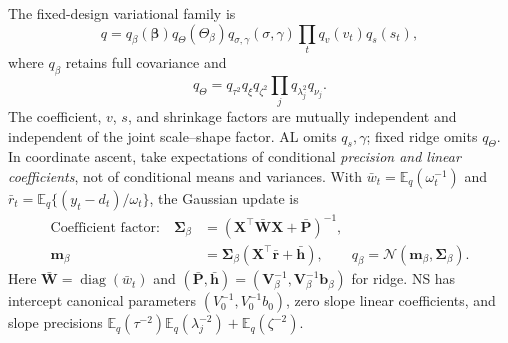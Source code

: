 \documentclass[12pt,letterpaper]{article}
\newcommand{\E}{\mathbb{E}}
\newcommand{\diag}{\operatorname{diag}}
\newcommand{\vect}[1]{\bm{#1}}
\newcommand{\mat}[1]{\bm{#1}}
\newcommand{\Normal}{\mathcal{N}}
\numberwithin{suppalgorithm}{section}
\numberwithin{equation}{section}
\numberwithin{table}{section}
\numberwithin{figure}{section}
\begin{document}
The fixed-design variational family is
\begin{equation}
q=q_\beta(\vect\beta)q_\Theta(\Theta_\beta)
 q_{\sigma,\gamma}(\sigma,\gamma)\prod_t q_v(v_t)q_s(s_t),
\label{eq:supp_generic_vb_family}
\end{equation}
where \(q_\beta\) retains full covariance and
\begin{equation}
q_\Theta=q_{\tau^2}q_\xi q_{\zeta^2}
 \prod_j q_{\lambda_j^2}q_{\nu_j}.
\label{eq:supp_generic_vb_scale_family}
\end{equation}
The coefficient, \(v\), \(s\), and shrinkage factors are mutually
independent and independent of the joint scale--shape factor. AL omits
\(q_s,\gamma\); fixed ridge omits \(q_\Theta\). In coordinate ascent,
take expectations of conditional \emph{precision and linear coefficients},
not of conditional means and variances. With
\(\bar w_t=\E_q(\omega_t^{-1})\) and
\(\bar r_t=\E_q\{(y_t-d_t)/\omega_t\}\), the Gaussian update is
\begin{equation}
\begin{aligned}
\text{Coefficient factor:}\quad
\mat\Sigma_\beta&=(\mat X^\top\bar{\mat W}\mat X+
 \bar{\mat P})^{-1},\\
\vect m_\beta&=\mat\Sigma_\beta
 (\mat X^\top\bar{\vect r}+\bar{\vect h}),\qquad
 q_\beta=\Normal(\vect m_\beta,\mat\Sigma_\beta).
\end{aligned}
\label{eq:supp_generic_vb_beta}
\end{equation}
Here \(\bar{\mat W}=\diag(\bar w_t)\) and
\((\bar{\mat P},\bar{\vect h})=(\mat V_\beta^{-1},
\mat V_\beta^{-1}\vect b_\beta)\) for ridge. NS has intercept canonical
parameters \((V_0^{-1},V_0^{-1}b_0)\), zero slope linear coefficients,
and slope precisions \(\E_q(\tau^{-2})\E_q(\lambda_j^{-2})+
\E_q(\zeta^{-2})\).
\end{document}
